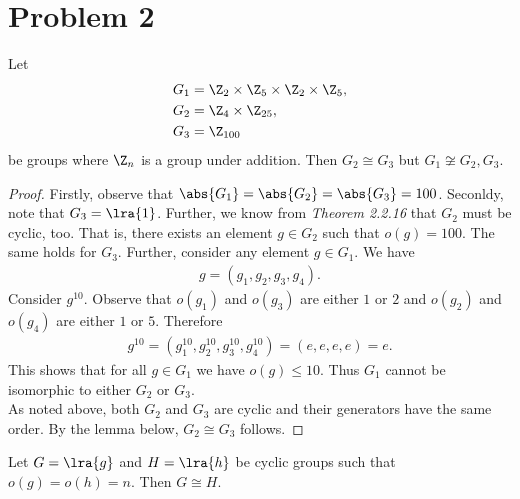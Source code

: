 \documentclass{article}
\begin{document}
\section*{Problem 2}


\begin{claim*}
    Let
    \begin{align*}
        G_1 &= \Z_2 \times \Z_5 \times \Z_2 \times \Z_5,\\
        G_2 &= \Z_4 \times \Z_{25},\\
        G_3 &= \Z_{100}
    \end{align*}
    be groups where $\Z_n$ is a group under addition. Then
    $G_2 \cong G_3$ but $G_1\not\cong G_2,G_3$.
\end{claim*}

\begin{proof}
    Firstly, observe that $\abs{G_1}=\abs{G_2}=\abs{G_3}=100$.
    Seconldy, note that $G_3=\lra{1}$. Further, we know from
    \emph{Theorem 2.2.16} that $G_2$ must be cyclic, too. That is,
    there exists an element $g\in G_2$ such that $o(g)=100$. The
    same holds for $G_3$. Further, consider any element $g\in G_1$.
    We have
    \begin{align*}
        g = (g_1, g_2, g_3, g_4).
    \end{align*}
    Consider $g^{10}$. Observe that $o(g_1)$ and $o(g_3)$ are either
    $1$ or $2$ and $o(g_2)$ and $o(g_4)$ are either $1$ or $5$. Therefore
    \begin{align*}
        g^{10}=(g_1^{10},g_2^{10},g_3^{10},g_4^{10})=(e,e,e,e)=e.
    \end{align*}
    This shows that for all $g\in G_1$ we have $o(g)\leq 10$. Thus
    $G_1$ cannot be isomorphic to either $G_2$ or $G_3$.\\
    \indent As noted above, both $G_2$ and $G_3$ are cyclic and their
    generators have the same order. By the lemma below, $G_2\cong G_3$
    follows.
\end{proof}


\begin{lemma*}
    Let $G=\lra{g}$ and $H=\lra{h}$ be cyclic groups such that
    $o(g)=o(h)=n$. Then $G\cong H$.
\end{lemma*}
\end{document}
